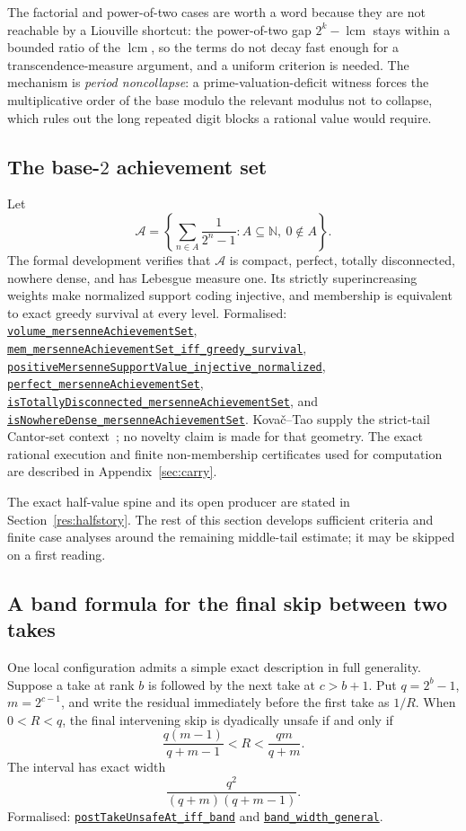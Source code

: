 \documentclass[11pt]{article}
\newcommand{\commit}{81150c1c6fdd4cd51e76d3aa0de344341e0e9e7c}
\newcommand{\repobase}{https://github.com/wcook04/plectis-lean-erdos249-257/blob/\commit}
\newcommand{\PK}{Erdos249257}
\newcommand{\lref}[3]{\href{\repobase/\PK/#1\#L#2}{\nolinkurl{#3}}}
\newcommand{\lrefx}[3]{\href{\repobase/\PK/#1\#L#2}{\nolinkurl{#3}}}
\theoremstyle{definition}
\theoremstyle{remark}
\newcommand{\N}{\mathbb{N}}
\newcommand{\lcm}{\operatorname{lcm}}
\begin{document}
The factorial and power-of-two cases are worth a word because they are not
reachable by a Liouville shortcut: the power-of-two gap $2^k-\lcm$ stays within a
bounded ratio of the $\lcm$, so the terms do not decay fast enough for a
transcendence-measure argument, and a uniform criterion is needed. The mechanism
is \emph{period noncollapse}: a
prime-valuation-deficit witness forces the multiplicative order of the base modulo
the relevant modulus not to collapse, which rules out the long repeated digit
blocks a rational value would require.

\subsection{The base-$2$ achievement set}

Let
\[
  \mathcal A=\left\{\sum_{n\in A}\frac1{2^n-1}:A\subseteq\N,\ 0\notin A\right\}.
\]
The formal development verifies that $\mathcal A$ is compact, perfect,
totally disconnected, nowhere dense, and has Lebesgue measure one.  Its
strictly superincreasing weights make normalized support coding injective,
and membership is equivalent to exact greedy survival at every level.
Formalised:
\lrefx{GreedyAchievementSet.lean}{996}{volume_mersenneAchievementSet},
\lrefx{GreedyAchievementSet.lean}{1445}{mem_mersenneAchievementSet_iff_greedy_survival},
\lrefx{GreedyAchievementSet.lean}{1527}{positiveMersenneSupportValue_injective_normalized},
\lrefx{GreedyAchievementSet.lean}{1620}{perfect_mersenneAchievementSet},
\lrefx{GreedyAchievementSet.lean}{1636}{isTotallyDisconnected_mersenneAchievementSet},
and
\lref{GreedyAchievementSet.lean}{1645}{isNowhereDense_mersenneAchievementSet}.
Kova\v{c}--Tao supply the strict-tail Cantor-set context~\cite{kovactao}; no
novelty claim is made for that geometry.  The exact rational execution and
finite non-membership certificates used for computation are described in
Appendix~\ref{sec:carry}.

The exact half-value spine and its open producer are stated in
Section~\ref{res:halfstory}.  The rest of this section develops sufficient
criteria and finite case analyses around the remaining middle-tail estimate;
it may be skipped on a first reading.

\subsection{A band formula for the final skip between two takes}
\label{res:twothirdsband}

One local configuration admits a simple exact description in full generality.
Suppose a take at rank $b$ is followed by the next take at $c>b+1$.  Put
$q=2^b-1$, $m=2^{c-1}$, and write the residual immediately before the first
take as $1/R$.  When $0<R<q$, the final intervening skip is dyadically unsafe
if and only if
\[
  \frac{q(m-1)}{q+m-1}<R<\frac{qm}{q+m}.
\]
The interval has exact width
\[
  \frac{q^2}{(q+m)(q+m-1)}.
\]
Formalised:
\lrefx{HalfGreedyTwoThirdsBand.lean}{88}{postTakeUnsafeAt_iff_band}
and
\lref{HalfGreedyTwoThirdsBand.lean}{104}{band_width_general}.
\end{document}
